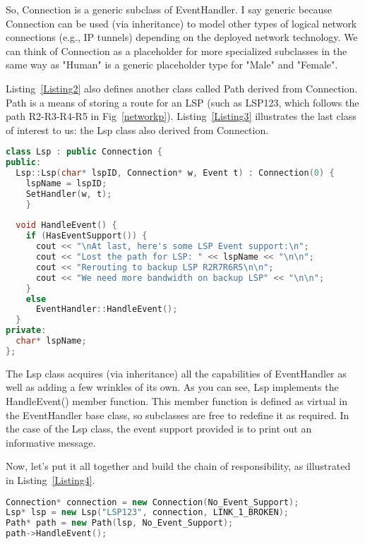 \documentclass{book}
\begin{document}
So, Connection is a generic subclass of EventHandler. I say generic because Connection can be used (via inheritance) to model other types of
logical network connections (e.g., IP tunnels) depending on the deployed network technology. 
We can think of Connection as a placeholder for more specialized subclasses in the same way as "Human" is a generic placeholder type for "Male" and "Female".

Listing~\ref{Listing2} also defines another class called Path derived from Connection.
Path is a means of storing a route for an LSP (such as LSP123, which follows the path R2-R3-R4-R5 in Fig~\ref{networkp}). Listing~\ref{Listing3} illustrates the last class of 
interest to us: the Lsp class also derived from Connection.
	
\begin{lstlisting}[caption={The Lsp Class—A specific Connection subclass},label={Listing3},language=C++ ]
class Lsp : public Connection {
public:
  Lsp::Lsp(char* lspID, Connection* w, Event t) : Connection(0) {
    lspName = lspID;
    SetHandler(w, t);   
    }
 
  void HandleEvent() {
    if (HasEventSupport()) {
      cout << "\nAt last, here's some LSP Event support:\n";
      cout << "Lost the path for LSP: " << lspName << "\n\n";
      cout << "Rerouting to backup LSP R2R7R6R5\n\n";
      cout << "We need more bandwidth on backup LSP" << "\n\n";
    }
    else
      EventHandler::HandleEvent(); 
  }
private:
  char* lspName; 
};
\end{lstlisting}

The Lsp class acquires (via inheritance) all the capabilities of EventHandler as well as adding a few wrinkles of its own.
As you can see, Lsp implements the HandleEvent() member function.
This member function is defined as virtual in the EventHandler base class, so subclasses are free to redefine it as required.
In the case of the Lsp class, the event support provided is to print out an informative message.

Now, let's put it all together and build the chain of responsibility, as illustrated in Listing~\ref{Listing4}.

\begin{lstlisting}[caption={The Chain of Responsibility},label={Listing4},language=C++ ]
Connection* connection = new Connection(No_Event_Support);
Lsp* lsp = new Lsp("LSP123", connection, LINK_1_BROKEN);
Path* path = new Path(lsp, No_Event_Support);
path->HandleEvent();
\end{lstlisting}
\end{document}
